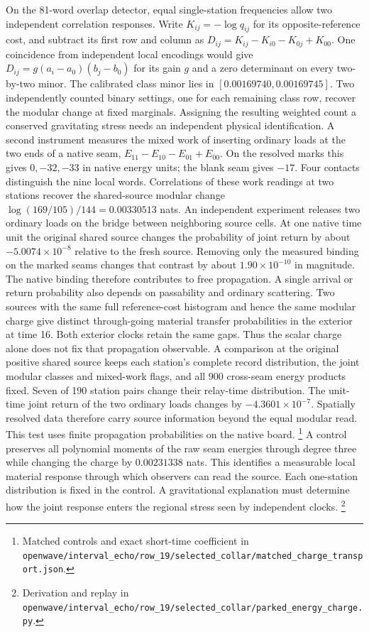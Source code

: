 \documentclass[11pt]{article}
\begin{document}
On the 81-word overlap detector, equal single-station frequencies
allow two independent correlation responses. Write $K_{ij}=-\log q_{ij}$
for its opposite-reference cost, and subtract its first row and column
as $D_{ij}=K_{ij}-K_{i0}-K_{0j}+K_{00}$. One coincidence from
independent local encodings would give
$D_{ij}=g(a_i-a_0)(b_j-b_0)$ for its gain $g$ and a zero determinant
on every two-by-two minor. The calibrated class minor lies in
$[0.00169740,0.00169745]$. Two independently counted binary settings,
one for each remaining class row, recover the modular change at fixed
marginals. Assigning the resulting weighted count a conserved
gravitating stress needs an independent physical identification.
A second instrument measures the mixed work of inserting ordinary loads
at the two ends of a native seam, $E_{11}-E_{10}-E_{01}+E_{00}$.
On the resolved marks this gives $0,-32,-33$ in native energy units;
the blank seam gives $-17$. Four contacts distinguish the nine local
words. Correlations of these work readings at two stations recover the
shared-source modular change $\log(169/105)/144=0.00330513$ nats.
An independent experiment releases two ordinary loads on the bridge
between neighboring source cells. At one native time unit the original
shared source changes the probability of joint return by about
$-5.0074\times10^{-8}$ relative to the fresh source. Removing only the
measured binding on the marked seams changes that contrast by about
$1.90\times10^{-10}$ in magnitude. The native binding therefore
contributes to free propagation. A single arrival or return probability
also depends on passability and ordinary scattering. Two sources with
the same full reference-cost histogram and hence the same modular
charge give distinct through-going material transfer probabilities in
the exterior at time 16. Both exterior clocks retain the same gaps.
Thus the scalar charge alone does not fix that propagation observable.
A comparison at the original positive shared source keeps each
station's complete record distribution, the joint modular classes
and mixed-work flags, and all 900 cross-seam energy products fixed.
Seven of 190 station pairs change their relay-time distribution.
The unit-time joint return of the two ordinary loads changes by
$-4.3601\times10^{-7}$. Spatially resolved data therefore carry
source information beyond the equal modular read. This test uses
finite propagation probabilities on the native board.%
\footnote{Matched controls and exact short-time coefficient in
\nolinkurl{openwave/interval_echo/row_19/selected_collar/matched_charge_transport.json}.}
A control preserves all polynomial moments of the raw seam energies
through degree three while changing the charge by $0.00231338$ nats.
This identifies a measurable local material response through which
observers can read the source. Each one-station distribution is fixed
in the control. A gravitational explanation must determine how the
joint response enters the regional stress seen by independent clocks.%
\footnote{Derivation and replay in
\nolinkurl{openwave/interval_echo/row_19/selected_collar/parked_energy_charge.py}.}
\end{document}
